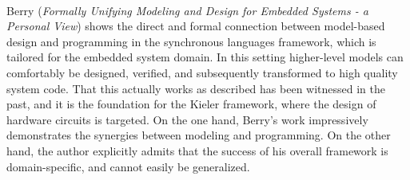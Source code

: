 

\ \hline \ %

Berry
\cite{isola-2016-berry}
({\em Formally Unifying Modeling and Design for
Embedded Systems - a Personal View})
shows the direct and formal connection between model-based design and programming in the synchronous languages framework, which is tailored for the embedded system domain. In this setting higher-level models can comfortably be designed, verified, and subsequently transformed to high quality system code. That this actually works as described has been witnessed in the past, and it is the foundation for the Kieler framework, where the design of hardware circuits is targeted. On the one hand, Berry's work impressively demonstrates the synergies between modeling and programming. On the other hand, the author explicitly admits that the success of his overall framework is domain-specific, and cannot easily be generalized.

\done{}

